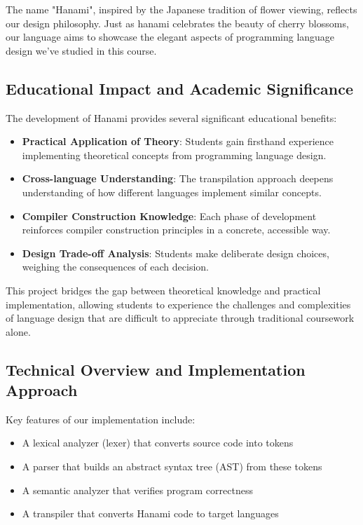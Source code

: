 \documentclass[conference]{IEEEtran}
\begin{document}
The name "Hanami", inspired by the Japanese tradition of flower viewing, reflects our design philosophy. Just as hanami celebrates the beauty of cherry blossoms, our language aims to showcase the elegant aspects of programming language design we've studied in this course.

\subsection{Educational Impact and Academic Significance}

The development of Hanami provides several significant educational benefits:

\begin{itemize}
    \item \textbf{Practical Application of Theory}: Students gain firsthand experience implementing theoretical concepts from programming language design.
    \item \textbf{Cross-language Understanding}: The transpilation approach deepens understanding of how different languages implement similar concepts.
    \item \textbf{Compiler Construction Knowledge}: Each phase of development reinforces compiler construction principles in a concrete, accessible way.
    \item \textbf{Design Trade-off Analysis}: Students make deliberate design choices, weighing the consequences of each decision.
\end{itemize}

This project bridges the gap between theoretical knowledge and practical implementation, allowing students to experience the challenges and complexities of language design that are difficult to appreciate through traditional coursework alone.

\FloatBarrier %
\subsection{Technical Overview and Implementation Approach}
\label{subsec:tech_overview} %

Key features of our implementation include:

\begin{itemize}
    \item A lexical analyzer (lexer) that converts source code into tokens
    \item A parser that builds an abstract syntax tree (AST) from these tokens
    \item A semantic analyzer that verifies program correctness
    \item A transpiler that converts Hanami code to target languages
\end{itemize}
\end{document}
